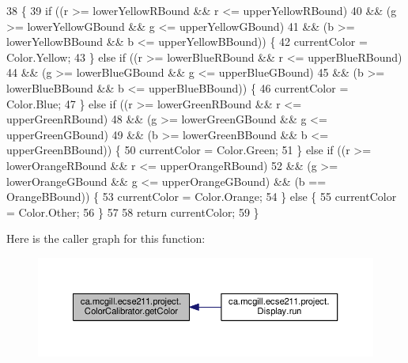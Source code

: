 \begin{DoxyCode}
38                                                     \{
39     \textcolor{keywordflow}{if} ((r >= lowerYellowRBound && r <= upperYellowRBound)
40         && (g >= lowerYellowGBound && g <= upperYellowGBound)
41         && (b >= lowerYellowBBound && b <= upperYellowBBound)) \{
42       currentColor = Color.Yellow;
43     \} \textcolor{keywordflow}{else} \textcolor{keywordflow}{if} ((r >= lowerBlueRBound && r <= upperBlueRBound)
44         && (g >= lowerBlueGBound && g <= upperBlueGBound)
45         && (b >= lowerBlueBBound && b <= upperBlueBBound)) \{
46       currentColor = Color.Blue;
47     \} \textcolor{keywordflow}{else} \textcolor{keywordflow}{if} ((r >= lowerGreenRBound && r <= upperGreenRBound)
48         && (g >= lowerGreenGBound && g <= upperGreenGBound)
49         && (b >= lowerGreenBBound && b <= upperGreenBBound)) \{
50       currentColor = Color.Green;
51     \} \textcolor{keywordflow}{else} \textcolor{keywordflow}{if} ((r >= lowerOrangeRBound && r <= upperOrangeRBound)
52         && (g >= lowerOrangeGBound && g <= upperOrangeGBound) && (b == OrangeBBound)) \{
53       currentColor = Color.Orange;
54     \} \textcolor{keywordflow}{else} \{
55       currentColor = Color.Other;
56     \}
57 
58     \textcolor{keywordflow}{return} currentColor;
59   \}
\end{DoxyCode}
Here is the caller graph for this function\+:\nopagebreak
\begin{figure}[H]
\begin{center}
\leavevmode
\includegraphics[width=350pt]{classca_1_1mcgill_1_1ecse211_1_1project_1_1_color_calibrator_a92e653a6a9f7a31cb7b6f9bc2e732133_icgraph}
\end{center}
\end{figure}
\mbox{\label{classca_1_1mcgill_1_1ecse211_1_1project_1_1_color_calibrator_a1acf05f9523b2c0f329d4a7cbf1b9c47}} 
